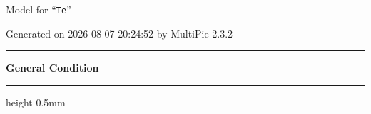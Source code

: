 \documentclass[fleqn,10pt,landscape]{jsarticle}
\begin{document}
\setcounter{MaxMatrixCols}{32}

\renewcommand{\tablename}{Table~}
\renewcommand{\figurename}{Figure~}
\setlength{\baselineskip}{16pt}
\setlength{\parindent}{0pt}
\setlength{\mathindent}{0pt}
\footnotesize
\begin{center}
\LARGE
Model for ``\texttt{Te}''
\end{center}
\begin{flushright}
Generated on 2026-08-07 20:24:52 by MultiPie 2.3.2
\end{flushright}
\setlength{\baselineskip}{16pt}
\footnotesize
\vspace{5mm}
\noindent \rule[0.5mm]{5mm}{0.5mm}\hspace{3mm}\textbf{General Condition}\hspace{3mm}\leaders\hrule height 0.5mm\hfill\kern0pt
\vspace{3mm}
\end{document}
